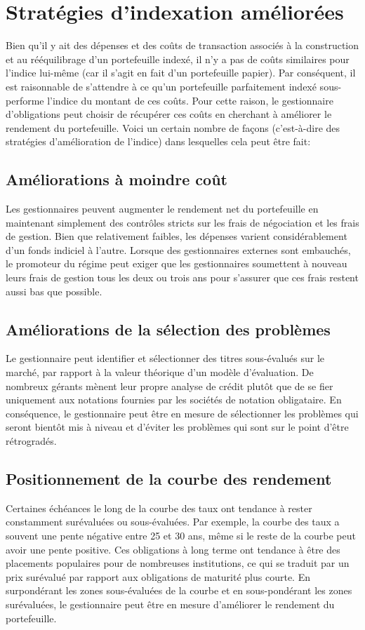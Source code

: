 \documentclass[12pt]{article}
\begin{document}
\section{Stratégies d'indexation améliorées}
Bien qu'il y ait des dépenses et des coûts de transaction associés à la construction et au rééquilibrage d'un portefeuille indexé, il n'y a pas de coûts similaires pour l'indice lui-même (car il s'agit en fait d'un portefeuille papier). Par conséquent, il est raisonnable de s'attendre à ce qu'un portefeuille parfaitement indexé sous-performe l'indice du montant de ces coûts. Pour cette raison, le gestionnaire d’obligations peut choisir de récupérer ces coûts en cherchant à améliorer le rendement du portefeuille.  Voici un certain nombre de façons (c'est-à-dire des stratégies d'amélioration de l'indice) dans lesquelles cela peut être fait: 
\subsection{Améliorations à moindre coût}
Les gestionnaires peuvent augmenter le rendement net du portefeuille en maintenant simplement des contrôles stricts sur les frais de négociation et les frais de gestion. Bien que relativement faibles, les dépenses varient considérablement d'un fonds indiciel à l'autre. Lorsque des gestionnaires externes sont embauchés, le promoteur du régime peut exiger que les gestionnaires soumettent à nouveau leurs frais de gestion tous les deux ou trois ans pour s'assurer que ces frais restent aussi bas que possible.
\subsection{Améliorations de la sélection des problèmes}
Le gestionnaire peut identifier et sélectionner des titres sous-évalués sur le marché, par rapport à la valeur théorique d’un modèle d’évaluation. De nombreux gérants mènent leur propre analyse de crédit plutôt que de se fier uniquement aux notations fournies par les sociétés de notation obligataire. En conséquence, le gestionnaire peut être en mesure de sélectionner les problèmes qui seront bientôt mis à niveau et d'éviter les problèmes qui sont sur le point d'être rétrogradés.
\subsection{Positionnement de la courbe des rendement}
Certaines échéances le long de la courbe des taux ont tendance à rester constamment surévaluées ou sous-évaluées. Par exemple, la courbe des taux a souvent une pente négative entre 25 et 30 ans, même si le reste de la courbe peut avoir une pente positive. Ces obligations à long terme ont tendance à être des placements populaires pour de nombreuses institutions, ce qui se traduit par un prix surévalué par rapport aux obligations de maturité plus courte. En surpondérant les zones sous-évaluées de la courbe et en sous-pondérant les zones surévaluées, le gestionnaire peut être en mesure d’améliorer le rendement du portefeuille.
\end{document}

